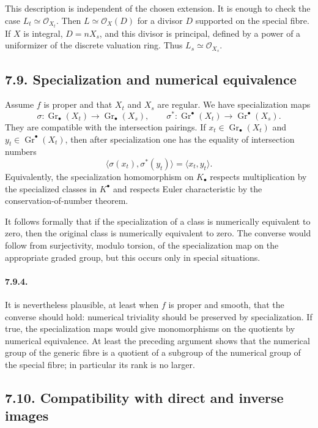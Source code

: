 \documentclass[12pt]{article}
\newcommand{\cO}{\mathcal O}
\newcommand{\Gr}{\operatorname{Gr}}
\newcommand{\longto}{\longrightarrow}
\begin{document}
This description is independent of the chosen extension. It is enough to check the case $L_t\simeq\cO_{X_t}$. Then $L\simeq\cO_X(D)$ for a divisor $D$ supported on the special fibre. If $X$ is integral, $D=nX_s$, and this divisor is principal, defined by a power of a uniformizer of the discrete valuation ring. Thus $L_s\simeq\cO_{X_s}$.

\subsection*{7.9. Specialization and numerical equivalence}

Assume $f$ is proper and that $X_t$ and $X_s$ are regular. We have specialization maps
\[
\sigma:\Gr_\bullet(X_t)\longto\Gr_\bullet(X_s),
\qquad
\sigma^*:\Gr^\bullet(X_t)\longto\Gr^\bullet(X_s).
\]
They are compatible with the intersection pairings. If $x_t\in\Gr_\bullet(X_t)$ and $y_t\in\Gr^\bullet(X_t)$, then after specialization one has the equality of intersection numbers
\[
\langle \sigma(x_t),\sigma^*(y_t)\rangle
=
\langle x_t,y_t\rangle.
\]
Equivalently, the specialization homomorphism on $K_\bullet$ respects multiplication by the specialized classes in $K^\bullet$ and respects Euler characteristic by the conservation-of-number theorem.

It follows formally that if the specialization of a class is numerically equivalent to zero, then the original class is numerically equivalent to zero. The converse would follow from surjectivity, modulo torsion, of the specialization map on the appropriate graded group, but this occurs only in special situations.

\paragraph{7.9.4.}
It is nevertheless plausible, at least when $f$ is proper and smooth, that the converse should hold: numerical triviality should be preserved by specialization. If true, the specialization maps would give monomorphisms on the quotients by numerical equivalence. At least the preceding argument shows that the numerical group of the generic fibre is a quotient of a subgroup of the numerical group of the special fibre; in particular its rank is no larger.

\subsection*{7.10. Compatibility with direct and inverse images}
\end{document}

